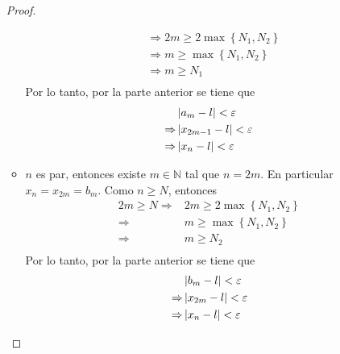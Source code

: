 \documentclass[12pt]{article}
\begin{document}
\begin{enumerate}
\begin{proof}
\begin{itemize}
\begin{equation*}
\begin{split}
                        &\Rightarrow2m\geq2\max\left\{N_1,N_2\right\}\\
                        &\Rightarrow m\geq\max\left\{N_1,N_2\right\}\\
                        &\Rightarrow m\geq N_1\\
                    \end{split}
                \end{equation*}
                Por lo tanto, por la parte anterior se tiene que
                \begin{equation*}
                    \begin{split}
                        &\left| a_m-l \right|<\varepsilon\\
                        \Rightarrow &\left| x_{2m-1}-l \right|<\varepsilon\\
                        \Rightarrow &\left| x_n-l \right|<\varepsilon\\
                    \end{split}
                \end{equation*}
                \item $n$ es par, entonces existe $m\in\mathbb{N}$ tal que $n=2m$. En particular $x_n=x_{2m}=b_m$. Como $n\geq N$, entonces
                \begin{equation*}
                    \begin{split}
                        2m\geq N\Rightarrow&2m\geq2\max\left\{N_1,N_2\right\}\\
                        \Rightarrow&m\geq\max\left\{N_1,N_2\right\}\\
                        \Rightarrow&m\geq N_2\\
                    \end{split}
                \end{equation*}
                Por lo tanto, por la parte anterior se tiene que
                \begin{equation*}
                    \begin{split}
                        &\left| b_m-l \right|<\varepsilon\\
                        \Rightarrow &\left| x_{2m}-l \right|<\varepsilon\\
                        \Rightarrow &\left| x_n-l \right|<\varepsilon\\
                    \end{split}
                \end{equation*}
            \end{itemize}

\end{proof}
\end{enumerate}
\end{document}

